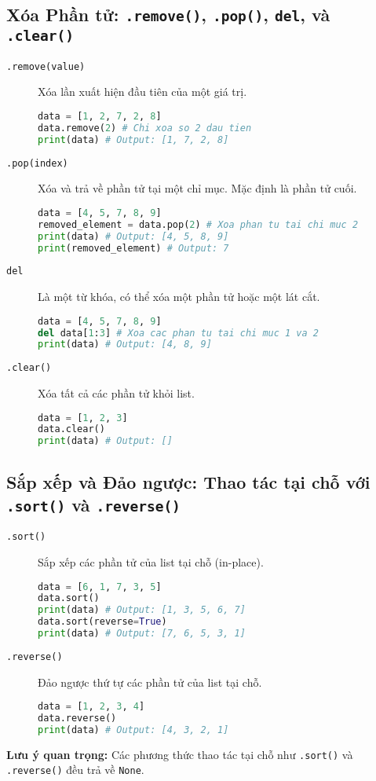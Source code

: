 \documentclass[11pt]{article}
\begin{document}
\subsection{Xóa Phần tử: \texttt{.remove()}, \texttt{.pop()}, \texttt{del}, và \texttt{.clear()}}
\begin{description}
    \item[\texttt{.remove(value)}] Xóa lần xuất hiện đầu tiên của một giá trị.
    \begin{lstlisting}[language=Python]
data = [1, 2, 7, 2, 8]
data.remove(2) # Chi xoa so 2 dau tien
print(data) # Output: [1, 7, 2, 8]
    \end{lstlisting}
    \item[\texttt{.pop(index)}] Xóa và trả về phần tử tại một chỉ mục. Mặc định là phần tử cuối.
    \begin{lstlisting}[language=Python]
data = [4, 5, 7, 8, 9]
removed_element = data.pop(2) # Xoa phan tu tai chi muc 2
print(data) # Output: [4, 5, 8, 9]
print(removed_element) # Output: 7
    \end{lstlisting}
    \item[\texttt{del}] Là một từ khóa, có thể xóa một phần tử hoặc một lát cắt.
    \begin{lstlisting}[language=Python]
data = [4, 5, 7, 8, 9]
del data[1:3] # Xoa cac phan tu tai chi muc 1 va 2
print(data) # Output: [4, 8, 9]
    \end{lstlisting}
    \item[\texttt{.clear()}] Xóa tất cả các phần tử khỏi list.
    \begin{lstlisting}[language=Python]
data = [1, 2, 3]
data.clear()
print(data) # Output: []
    \end{lstlisting}
\end{description}

\subsection{Sắp xếp và Đảo ngược: Thao tác tại chỗ với \texttt{.sort()} và \texttt{.reverse()}}
\begin{description}
    \item[\texttt{.sort()}] Sắp xếp các phần tử của list tại chỗ (in-place).
    \begin{lstlisting}[language=Python]
data = [6, 1, 7, 3, 5]
data.sort()
print(data) # Output: [1, 3, 5, 6, 7]
data.sort(reverse=True)
print(data) # Output: [7, 6, 5, 3, 1]
    \end{lstlisting}
    \item[\texttt{.reverse()}] Đảo ngược thứ tự các phần tử của list tại chỗ.
    \begin{lstlisting}[language=Python]
data = [1, 2, 3, 4]
data.reverse()
print(data) # Output: [4, 3, 2, 1]
    \end{lstlisting}
\end{description}
\textbf{Lưu ý quan trọng:} Các phương thức thao tác tại chỗ như \texttt{.sort()} và \texttt{.reverse()} đều trả về \texttt{None}.
\end{document}
